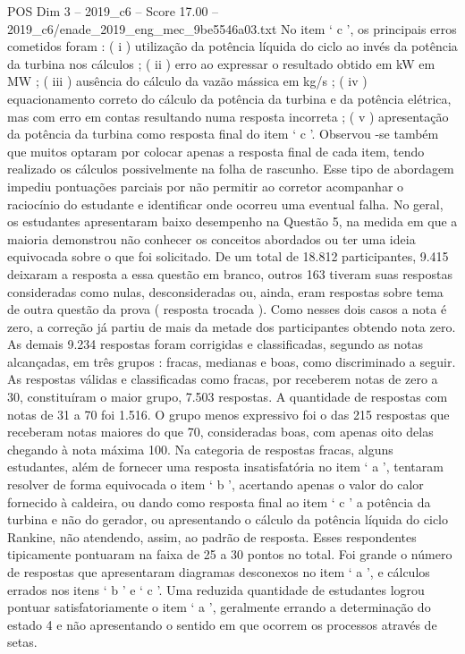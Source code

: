 \begin{textsample}{POS Dim 3 – 2019\_c6 – Score 17.00 – 2019\_c6/enade\_2019\_eng\_mec\_9be5546a03.txt}
No item ‘ c ’, os principais erros cometidos foram : ( i ) utilização da potência líquida do ciclo ao invés da potência da turbina nos cálculos ; ( ii ) erro ao expressar o resultado obtido em kW em MW ; ( iii ) ausência do cálculo da vazão mássica em kg/s ; ( iv ) equacionamento correto do cálculo da potência da turbina e da potência elétrica, mas com erro em contas resultando numa resposta incorreta ; ( v ) apresentação da potência da turbina como resposta final do item ‘ c ’.
Observou -se também que muitos optaram por colocar apenas a resposta final de cada item, tendo realizado os cálculos possivelmente na folha de rascunho.
Esse tipo de abordagem impediu pontuações parciais por não permitir ao corretor acompanhar o raciocínio do estudante e identificar onde ocorreu uma eventual falha.
No geral, os estudantes apresentaram baixo desempenho na Questão 5, na medida em que a maioria demonstrou não conhecer os conceitos abordados ou ter uma ideia equivocada sobre o que foi solicitado.
De um total de 18.812 participantes, 9.415 deixaram a resposta a essa questão em branco, outros 163 tiveram suas respostas consideradas como nulas, desconsideradas ou, ainda, eram respostas sobre tema de outra questão da prova ( resposta trocada ).
Como nesses dois casos a nota é zero, a correção já partiu de mais da metade dos participantes obtendo nota zero.
As demais 9.234 respostas foram corrigidas e classificadas, segundo as notas alcançadas, em três grupos : fracas, medianas e boas, como discriminado a seguir.
As respostas válidas e classificadas como fracas, por receberem notas de zero a 30, constituíram o maior grupo, 7.503 respostas.
A quantidade de respostas com notas de 31 a 70 foi 1.516.
O grupo menos expressivo foi o das 215 respostas que receberam notas maiores do que 70, consideradas boas, com apenas oito delas chegando à nota máxima 100.
Na categoria de respostas fracas, alguns estudantes, além de fornecer uma resposta insatisfatória no item ‘ a ’, tentaram resolver de forma equivocada o item ‘ b ’, acertando apenas o valor do calor fornecido à caldeira, ou dando como resposta final ao item ‘ c ’ a potência da turbina e não do gerador, ou apresentando o cálculo da potência líquida do ciclo Rankine, não atendendo, assim, ao padrão de resposta.
Esses respondentes tipicamente pontuaram na faixa de 25 a 30 pontos no total.
Foi grande o número de respostas que apresentaram diagramas desconexos no item ‘ a ’, e cálculos errados nos itens ‘ b ’ e ‘ c ’.
Uma reduzida quantidade de estudantes logrou pontuar satisfatoriamente o item ‘ a ’, geralmente errando a determinação do estado 4 e não apresentando o sentido em que ocorrem os processos através de setas.

\end{textsample}

